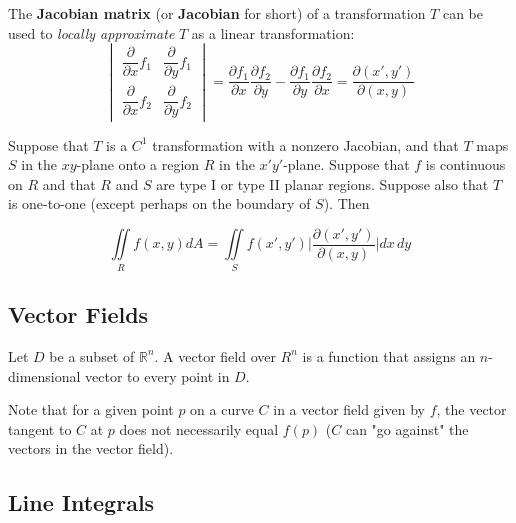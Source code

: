 The \textbf{Jacobian matrix} (or \textbf{Jacobian} for short) of a transformation $T$ can be used to \textit{locally approximate} $T$ as a linear transformation: $$\begin{vmatrix}
\dfrac{\partial}{\partial x} f_{1} & \dfrac{\partial}{\partial y} f_{1} \\
\dfrac{\partial}{\partial x} f_{2} & \dfrac{\partial}{\partial y} f_{2}
\end{vmatrix}
= \dfrac{\partial f_{1}}{\partial x} \dfrac{\partial f_{2}}{\partial y}
- \dfrac{\partial f_{1}}{\partial y} \dfrac{\partial f_{2}}{\partial x}
= \dfrac{\partial(x', y')}{\partial(x, y)}$$

Suppose that $T$ is a $C^{1}$ transformation with a nonzero Jacobian, and that $T$ maps $S$ in the $xy$-plane onto a region $R$ in the $x'y'$-plane. Suppose that $f$ is continuous on $R$ and that $R$ and $S$ are type I or type II planar regions. Suppose also that $T$ is one-to-one (except perhaps on the boundary of $S$). Then

$$ \iint\limits_{R} f(x,y) dA = \iint\limits_{S} f(x', y') \Big| \dfrac{\partial(x', y')}{\partial(x, y)} \Big| dx \, dy$$

\pagebreak

\begin{center}
\section{Vector Fields}
\end{center}

Let $D$ be a subset of $\mathbb{R}^{n}$. A vector field over $R^{n}$ is a function that assigns an $n$-dimensional vector to every point in $D$.

Note that for a given point $p$ on a curve $C$ in a vector field given by $f$, the vector tangent to $C$ at $p$ does not necessarily equal $f(p)$ ($C$ can "go against" the vectors in the vector field).

\subsection{Line Integrals}

